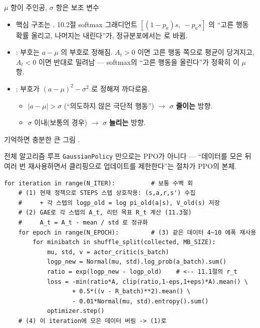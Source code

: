\documentclass[aspectratio=169,11pt]{beamer}
\begin{document}
\begin{frame}{$\mu$ 항이 주인공, $\sigma$ 항은 보조 변수}
  \begin{itemize}
    \item 핵심 구조는 . 10.2절 softmax 그래디언트
      $[(1-p_a)s,\ -p_as]$ 의 ``고른 행동 확률 올리고, 나머지는
      내린다''가, 정규분포에서는 로 바뀜.
    \item {}: 부호는 $a-\mu$ 의 부호로 정해짐.
      $A_t>0$ 이면 고른 행동 쪽으로 평균이 당겨지고, $A_t<0$
      이면 반대로 밀려남 — softmax의 ``고른 행동을 올린다''가
      정확히 이 $\mu$ 항.
    \item {}: 부호가 $(a-\mu)^2-\sigma^2$ 로 정해져
      까다로움.
      \begin{itemize}
        \item $|a-\mu|>\sigma$ (``의도하지 않은 극단적 행동'')
          $\to$ $\sigma$ \textbf{줄이는} 방향.
        \item $\sigma$ 이내(보통의 경우) $\to$ $\sigma$
          \textbf{늘리는} 방향.
      \end{itemize}
  \end{itemize}
  \begin{block}{기억하면 충분한 큰 그림}
    .
  \end{block}
\end{frame}

\begin{frame}[fragile]{전체 알고리즘 루프}
  \texttt{GaussianPolicy} 만으로는 PPO가 아니다 —
  ``데이터를 모은 뒤 여러 번 재사용하면서 클리핑으로 업데이트를
  제한한다''는 절차가 PPO의 본체.
  \begin{lstlisting}
for iteration in range(N_ITER):          # 보통 수백 회
    # (1) 현재 정책으로 STEPS 스텝 상호작용: (s,a,r,s') 수집
    #     + 각 스텝의 logp_old = log pi_old(a|s), V_old(s) 저장
    # (2) GAE로 각 스텝의 A_t, 리턴 목표 R_t 계산 (11.3절)
    #     A_t = A_t - mean / std 로 정규화
    for epoch in range(N_EPOCH):         # (3) 같은 데이터 4~10 에폭 재사용
        for minibatch in shuffle_split(collected, MB_SIZE):
            mu, std, v = actor_critic(s_batch)
            logp_new = Normal(mu, std).log_prob(a_batch).sum()
            ratio = exp(logp_new - logp_old)    # <-- 11.1절의 r_t
            loss = -min(ratio*A, clip(ratio,1-eps,1+eps)*A).mean() \
                   + 0.5*((v - R_batch)**2).mean() \
                   - 0.01*Normal(mu, std).entropy().sum()
            optimizer.step()
    # (4) 이 iteration에 모은 데이터 버림 -> (1)로
  \end{lstlisting}
\end{frame}
\end{document}
